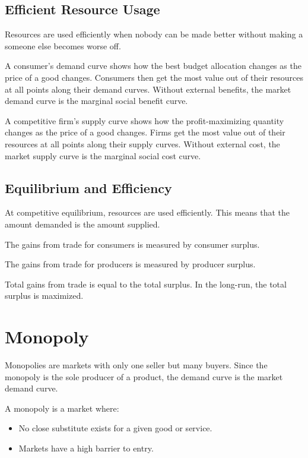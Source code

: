             \section{Efficient Resource Usage} %
            \label{sec:efficient_resource_usage}
                Resources are used efficiently when nobody can be made better without making a someone else becomes worse off.

                A consumer's demand curve shows how the best budget allocation changes as the price of a good changes.
                Consumers then get the most value out of their resources at all points along their demand curves.
                Without external benefits, the market demand curve is the marginal social benefit curve.

                A competitive firm's supply curve shows how the profit-maximizing quantity changes as the price of a good changes.
                Firms get the most value out of their resources at all points along their supply curves.
                Without external cost, the market supply curve is the marginal social cost curve.
            \section{Equilibrium and Efficiency} %
            \label{sec:equilibrium_and_efficiency}
                At competitive equilibrium, resources are used efficiently.
                This means that the amount demanded is the amount supplied.

                The gains from trade for consumers is measured by consumer surplus.

                The gains from trade for producers is measured by producer surplus.

                Total gains from trade is equal to the total surplus.
                In the long-run, the total surplus is maximized.
        \chapter{Monopoly} %
        \label{cha:monopoly}
            Monopolies are markets with only one seller but many buyers.
            Since the monopoly is the sole producer of a product, the demand curve is the market demand curve.

            A monopoly is a market where:
            \begin{itemize}
                \item No close substitute exists for a given good or service.
                \item Markets have a high barrier to entry.
            \end{itemize}

